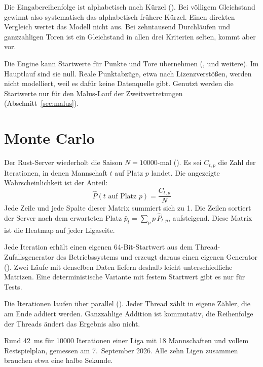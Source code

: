 Die Eingabereihenfolge ist alphabetisch nach Kürzel
(). Bei völligem Gleichstand gewinnt also
systematisch das alphabetisch frühere Kürzel. Einen direkten Vergleich wertet
das Modell nicht aus. Bei zehntausend Durchläufen und ganzzahligen Toren ist
ein Gleichstand in allen drei Kriterien selten, kommt aber vor.

Die Engine kann Startwerte für Punkte und Tore übernehmen
(,  und weitere). Im Hauptlauf sind sie
null. Reale Punktabzüge, etwa nach Lizenzverstößen, werden nicht modelliert,
weil es dafür keine Datenquelle gibt. Genutzt werden die Startwerte nur für
den Malus-Lauf der Zweitvertretungen (Abschnitt~\ref{sec:malus}).

\section{Monte Carlo}

Der Rust-Server wiederholt die Saison $N = \num{10000}$-mal
(). Es sei $C_{t,p}$ die
Zahl der Iterationen, in denen Mannschaft $t$ auf Platz $p$ landet. Die
angezeigte Wahrscheinlichkeit ist der Anteil:
\begin{equation}\label{eq:mc}
  \boxed{\;\hat P(t \text{ auf Platz } p) = \frac{C_{t,p}}{N}\;}
\end{equation}
Jede Zeile und jede Spalte dieser Matrix summiert sich zu 1. Die Zeilen
sortiert der Server nach dem erwarteten Platz
$\bar p_t = \sum_p p\,\hat P_{t,p}$, aufsteigend. Diese Matrix ist die
Heatmap auf jeder Ligaseite.

\begin{description}[font=\sffamily\bfseries\small]
  \item[Zufallszahlen] Jede Iteration erhält einen eigenen 64-Bit-Startwert
        aus dem Thread-Zufallsgenerator des Betriebssystems und erzeugt daraus
        einen eigenen Generator (). Zwei Läufe
        mit denselben Daten liefern deshalb leicht unterschiedliche Matrizen.
        Eine deterministische Variante mit festem Startwert gibt es nur für
        Tests.
  \item[Parallelität] Die Iterationen laufen über  parallel
        (). Jeder Thread zählt in eigene
        Zähler, die am Ende addiert werden. Ganzzahlige Addition ist
        kommutativ, die Reihenfolge der Threads ändert das Ergebnis also nicht.
  \item[Laufzeit] Rund 42~ms für \num{10000} Iterationen einer Liga mit 18
        Mannschaften und vollem Restspielplan, gemessen am 7.~September 2026.
        Alle zehn Ligen zusammen brauchen etwa eine halbe Sekunde.
\end{description}

